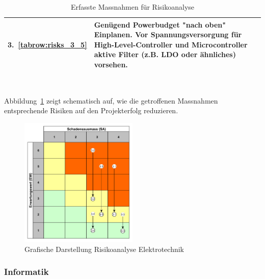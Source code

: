 \documentclass[main.tex]{subfiles} %
\begin{document}
\begin{table}[H]
\begin{tabularx}{\textwidth}{|>{\centering\arraybackslash}p{2cm}|>{\raggedright\arraybackslash}X|>{\centering\arraybackslash}p{0.75cm}|}
        \hline
        \rowcolor{yellow!30}
        3.~\ref{tabrow:risks_3_5} & Genügend Powerbudget "nach oben" Einplanen. Vor Spannungsversorgung für High-Level-Controller und Microcontroller aktive Filter (z.B. LDO oder ähnliches) vorsehen.
                                  & 2                                                                                                                                                                                                      \\
        \hline

    \end{tabularx}
    \caption{Erfasste Massnahmen für Risikoanalyse}~\label{tab:Erfasste_Massnahmen}
\end{table}

Abbildung~\ref{fig:Diagramm_Risiko_elektro} zeigt schematisch auf, wie die
getroffenen Massnahmen entsprechende Risiken auf den Projekterfolg reduzieren.

\begin{figure}[h]
    \centering
    \includegraphics[width=0.5\textwidth]{./Risks_Diagramm/Diagramm_Risiko_elektro.pdf}
    \caption{Grafische Darstellung Risikoanalyse Elektrotechnik}
    \label{fig:Diagramm_Risiko_elektro}
\end{figure}


\subsubsection*{Informatik}
\end{document}
